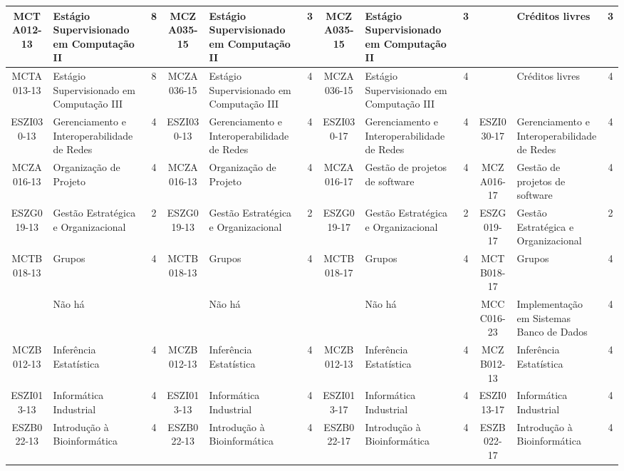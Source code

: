\documentclass[a4paper]{article}
\begin{document}
\begin{landscape}
{\begin{longtable}{|c|p{.2\textheight}|c||c|p{.2\textheight}|c||c|p{.2\textheight}|c||c|p{.2\textheight}|c|}
MCTA012-13 & Estágio Supervisionado em Computação II& 8 &
MCZA035-15 & Estágio Supervisionado em Computação II & 3 &
MCZA035-15 & Estágio Supervisionado em Computação II & 3 &
& Créditos livres & 3 \\ \hline

MCTA013-13 & Estágio Supervisionado em Computação III& 8 &
MCZA036-15 & Estágio Supervisionado em Computação III & 4 &
MCZA036-15 & Estágio Supervisionado em Computação III & 4 &
& Créditos livres & 4\\ \hline

ESZI030-13 & Gerenciamento e Interoperabilidade de Redes & 4 &
ESZI030-13 & Gerenciamento e Interoperabilidade de Redes & 4 &
ESZI030-17 & Gerenciamento e Interoperabilidade de Redes & 4 & 
ESZI030-17 & Gerenciamento e Interoperabilidade de Redes & 4\\ \hline

MCZA016-13 & Organização de Projeto & 4 &
MCZA016-13 & Organização de Projeto & 4 &
MCZA016-17 & Gestão de projetos de software & 4 & 
MCZA016-17 & Gestão de projetos de software & 4\\ \hline

ESZG019-13 & Gestão Estratégica e Organizacional & 2 &
ESZG019-13 & Gestão Estratégica e Organizacional & 2 &
ESZG019-17 & Gestão Estratégica e Organizacional & 2 &
ESZG019-17 & Gestão Estratégica e Organizacional & 2\\ \hline

MCTB018-13 & Grupos & 4 &
MCTB018-13 & Grupos & 4 &
MCTB018-17 & Grupos & 4 &
MCTB018-17 & Grupos & 4\\ \hline

& Não há & &
& Não há & & 
& Não há & & 
MCCC016-23 & Implementação em Sistemas Banco de Dados & 4\\ \hline

MCZB012-13 & Inferência Estatística & 4 &
MCZB012-13 & Inferência Estatística & 4 &
MCZB012-13 & Inferência Estatística & 4 &
MCZB012-13 & Inferência Estatística & 4\\ \hline

ESZI013-13 & Informática Industrial & 4 &
ESZI013-13 & Informática Industrial & 4 &
ESZI013-17 & Informática Industrial & 4 & 
ESZI013-17 & Informática Industrial & 4\\ \hline

ESZB022-13 & Introdução à Bioinformática & 4 &
ESZB022-13 & Introdução à Bioinformática & 4 &
ESZB022-17 & Introdução à Bioinformática & 4 & 
ESZB022-17 & Introdução à Bioinformática & 4\\ \hline


\end{longtable}}
\end{landscape}
\end{document}
